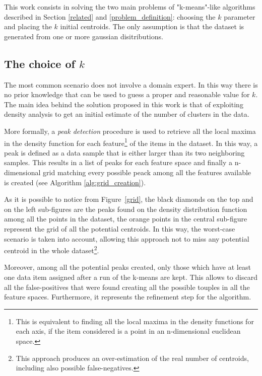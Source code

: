 This work consists in solving the two main problems of "k-means"-like 
algorithms described in Section \ref{related} and \ref{problem_definition}:
choosing the $k$ parameter and placing the $k$ initial centroids.
The only assumption is that the dataset is generated from one or more gaussian
disitributions.


\subsection*{The choice of $k$}
The most common scenario does not involve a domain expert. In this way there is 
no prior knowledge that can be used to guess a proper and reasonable value for $k$.
The main idea behind the solution proposed in this work is that of exploiting density
analysis to get an initial estimate of the number of clusters in the data.

More formally, a \emph{peak detection} procedure is used to retrieve 
all the local maxima in the density function for each feature\footnote{This is equivalent to
finding all the local maxima in the density functions for each axis, if the item considered is
a point in an n-dimensional euclidean space.} of the items in the dataset. In this way,
a peak is defined as a data sample that is either larger than its two neighboring samples.
This results in a list of peaks for each feature space and finally a n-dimensional grid
matching every possible peack among all the features available is created
(see Algorithm \ref{alg:grid_creation}).


As it is possible to notice from Figure~\ref{grid}, the black diamonds on the top and on
the left sub-figures are the peaks found on the density distribution function among all
the points in the dataset, the orange points in the central sub-figure represent the
grid of all the potential centroids.
In this way, the worst-case scenario is taken into account, allowing this approach not
to miss any potential centroid in the whole dataset\footnote{This approach produces an 
over-estimation of the real number of centroids, including also possible false-negatives.}.

\begin{figure*}
  \caption{The grid with all the potential centroids computed from the peaks.}
  \label{grid}
\end{figure*}

Moreover, among all the potential peaks created, only those which have at least one data
item assigned after a run of the k-means are kept. This allows to discard all the 
false-positives that were found creating all the possible touples in all the feature spaces.
Furthermore, it represents the refinement step for the algorithm.


